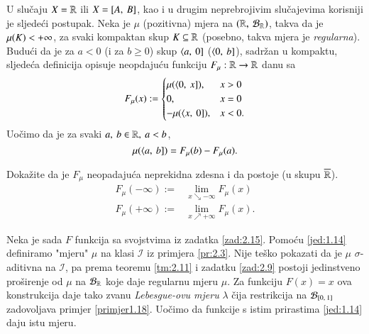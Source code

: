 U slu\v caju $X = \mathbb{R}$ ili $X = [{A}, \:{B}]$, kao i u drugim
neprebrojivim slu\v cajevima korisniji je sljede\' ci postupak.
Neka je $\mu$ (pozitivna) mjera na $(\mathbb{R}, \: \mathcal{B}_{\mathbb{R}})$, takva da je
$\mu({K}) < +\infty$, za svaki kompaktan skup $K \subseteq \mathbb{R}$
(posebno, takva mjera je \emph{regularna}). Budu\' ci da je za
$a < 0$ (i za $b \geq 0$) skup $\langle {a}, \: {0}]$ ($\langle {0}, \: {b}]$),
sadr\v zan u kompaktu, sljede\' ca definicija opisuje neopdaju\' cu
funkciju $F_{\mu}: \mathbb{R} \to \mathbb{R}$ danu sa
\begin{equation}    \label{jed:2.13}
    F_{\mu}(x) :=
        \begin{cases}
            \mu({\langle {0}, \: {x}]}), &x > 0\\
            0,   &x = 0\\
            - \mu({\langle {x}, \: {0}]}), &x < 0.
        \end{cases}
\end{equation}
Uo\v cimo da je za svaki $a, \: b \in \mathbb{R}, \: a < b$,
\begin{equation}    \label{jed:1.14}
    \mu({\langle {a}, \: {b}]}) = F_{\mu}(b) - F_{\mu}(a).
\end{equation}

\begin{zad} \label{zad:2.15}
    Doka\v zite da je $F_{\mu}$ neopadaju\' ca neprekidna zdesna i da
    postoje (u skupu $\overline{\mathbb{R}}$).
    \begin{align*}
        F_{\mu}(-\infty) :=& \lim_{x \searrow -\infty} F_{\mu}(x)\\
        F_{\mu}(+\infty) :=& \lim_{x \nearrow +\infty} F_{\mu}(x).
    \end{align*}
\end{zad}

Neka je sada $F$ funkcija sa svojstvima iz zadatka \ref{zad:2.15}.
Pomo\' cu \eqref{jed:1.14} definiramo "mjeru" $\mu$ na klasi
$\mathcal{I}$ iz primjera \eqref{pr:2.3}. Nije te\v sko pokazati
da je $\mu$ $\sigma$-aditivna na $\mathcal{I}$, pa prema teoremu
\ref{tm:2.11} i zadatku \ref{zad:2.9} postoji jedinstveno
pro\v sirenje od $\mu$ na $\mathcal{B}_{\mathbb{R}}$ koje daje regularnu mjeru
$\mu$. Za funkciju $F(x) = x$ ova konstrukcija daje tako zvanu
\emph{Lebesgue-ovu mjeru} $\lambda$ \v cija restrikcija na
$\mathcal{B}_{[{0}, \:{1}]}$ zadovoljava primjer \ref{primjer1.18}.
Uo\v cimo da funkcije s istim prirastima \eqref{jed:1.14}
daju istu mjeru.


